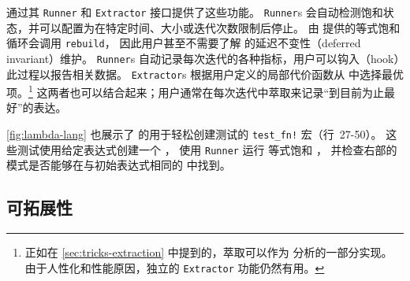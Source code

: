 \egg 通过其 \texttt{Runner} 和 \texttt{Extractor} 接口提供了这些功能。
\texttt{Runner}s 会自动检测饱和状态，并可以配置为在特定时间、\egraph 大小或迭代次数限制后停止。
由 \egg 提供的等式饱和循环会调用 \texttt{rebuild}，
  因此用户甚至不需要了解 \egg 的延迟不变性（deferred invariant）维护。
\texttt{Runner}s 自动记录每次迭代的各种指标，用户可以钩入（hook）此过程以报告相关数据。
\texttt{Extractor}s 根据用户定义的局部代价函数从 \egraph 中选择最优项。\footnote{
    正如在 \autoref{sec:tricks-extraction} 中提到的，萃取可以作为 \eclass 分析的一部分实现。
    由于人性化和性能原因，独立的 \texttt{Extractor} 功能仍然有用。
  }
这两者也可以结合起来；用户通常在每次迭代中萃取来记录“到目前为止最好”的表达。

\autoref{fig:lambda-lang} 也展示了 \egg 的用于轻松创建测试的 \texttt{test\_fn!} 宏（行~27-50）。
这些测试使用给定表达式创建一个 \egraph，
  使用 \texttt{Runner} 运行 等式饱和 ，
  并检查右部的模式是否能够在与初始表达式相同的 \eclass 中找到。

\subsection{可拓展性}
\label{sec:egg-extensible}


